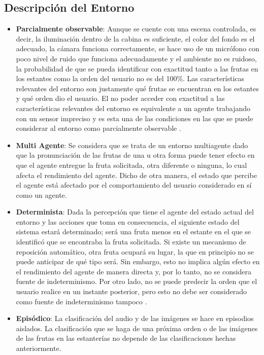 \documentclass[a4paper, 12pt]{article}
\begin{document}
\subsection{Descripción del Entorno}
\begin{itemize}
\item \textbf{Parcialmente observable}: Aunque se cuente con una escena controlada, es decir, la iluminación dentro de la cabina es suficiente, el color del fondo es el adecuado, la cámara funciona correctamente, se hace uso de un micrófono con poco nivel de ruido que funciona adecuadamente y el ambiente no es ruidoso, la probabilidad de que se pueda identificar con exactitud tanto a las frutas en los estantes como la orden del usuario no es del 100\%. Las características relevantes del entorno son justamente qué frutas se encuentran en los estantes y qué orden dio el usuario. El no poder acceder con exactitud a las características relevantes del entorno es equivalente a un agente trabajando con un sensor impreciso y es esta una de las condiciones en las que se puede considerar al entorno como parcialmente observable \cite{referencia}.
\item \textbf{Multi Agente}: Se considera que se trata de un entorno multiagente dado que la pronunciación de las frutas de una u otra forma puede tener efecto en que el agente entregue la fruta solicitada, otra diferente o ninguna, lo cual afecta el rendimiento del agente. Dicho de otra manera, el estado que percibe el agente está afectado por el comportamiento del usuario considerado en sí como un agente.
\item \textbf{Determinista}: Dada la percepción que tiene el agente del estado actual del entorno y las acciones que toma en consecuencia, el siguiente estado del sistema estará determinado; será una fruta menos en el estante en el que se identificó que se encontraba la fruta solicitada. Si existe un mecanismo de reposición automático, otra fruta ocupará su lugar, la que en principio no se puede anticipar de qué tipo será. Sin embargo, esto no implica algún efecto en el rendimiento del agente de manera directa y, por lo tanto, no se considera fuente de indeterminismo. Por otro lado, no se puede predecir la orden que el usuario realice en un instante posterior, pero esto no debe ser considerado como fuente de indeterminismo tampoco \cite{referencia}.
\item \textbf{Episódico}: La clasificación del audio y de las imágenes se hace en episodios aislados. La clasificación que se haga de una próxima orden o de las imágenes de las frutas en las estanterías no depende de las clasificaciones hechas anteriormente.

\end{itemize}
\end{document}
